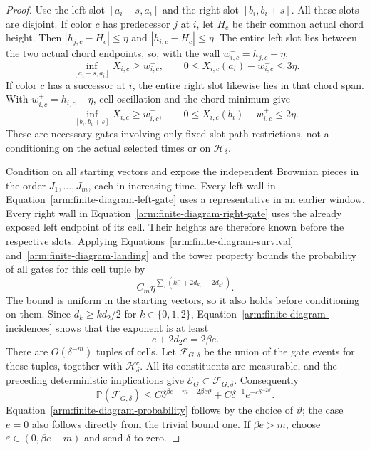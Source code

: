 \begin{proof}
Use the left slot $[a_i-s,a_i]$ and the right slot $[b_i,b_i+s]$.
All these slots are disjoint.  If color $c$ has predecessor $j$ at
$i$, let $H_c$ be their common actual chord height.  Then
$|h_{j,c}-H_c|\le\eta$ and $|h_{i,c}-H_c|\le\eta$.
The entire left slot lies between the two actual chord endpoints,
so, with the wall $w_{i,c}^-=h_{j,c}-\eta$,
\begin{equation}
\label{arm:finite-diagram-left-gate}
 \inf_{[a_i-s,a_i]}X_{i,c}\ge w_{i,c}^-,\qquad
 0\le X_{i,c}(a_i)-w_{i,c}^-\le3\eta.
\end{equation}
If color $c$ has a successor at $i$, the entire right slot likewise
lies in that chord span.  With $w_{i,c}^+=h_{i,c}-\eta$, cell
oscillation and the chord minimum give
\begin{equation}
\label{arm:finite-diagram-right-gate}
 \inf_{[b_i,b_i+s]}X_{i,c}\ge w_{i,c}^+,\qquad
 0\le X_{i,c}(b_i)-w_{i,c}^+\le2\eta.
\end{equation}
These are necessary gates involving only fixed-slot path restrictions,
not a conditioning on the actual selected times or on
$\mathcal H_\delta$.

Condition on all starting vectors and expose the independent Brownian
pieces in the order $J_1,\ldots,J_m$, each in increasing time.
Every left wall in Equation~\eqref{arm:finite-diagram-left-gate}
uses a representative in an earlier window.  Every right wall in
Equation~\eqref{arm:finite-diagram-right-gate} uses the already
exposed left endpoint of its cell.  Their heights are therefore
known before the respective slots.  Applying
Equations~\eqref{arm:finite-diagram-survival}
and~\eqref{arm:finite-diagram-landing} and the tower property bounds
the probability of all gates for this cell tuple by
\[
 C_m\eta^{\sum_i(k_i^-+2d_{k_i^-}+2d_{k_i^+})}.
\]
The bound is uniform in the starting vectors, so it also holds before
conditioning on them.  Since
$d_k\ge k d_2/2$ for $k\in\{0,1,2\}$,
Equation~\eqref{arm:finite-diagram-incidences} shows that the exponent
is at least
\[
 e+2d_2e=2\beta e.
\]
There are $O(\delta^{-m})$ tuples of cells.  Let
$\mathcal F_{G,\delta}$ be the union of the gate events for these
tuples, together with $\mathcal H_\delta^c$.  All its constituents
are measurable, and the preceding deterministic implications give
$\mathcal E_G\subset\mathcal F_{G,\delta}$.  Consequently
\[
 \mathbb P(\mathcal F_{G,\delta})
 \le C\delta^{\beta e-m-2\beta e\vartheta}
       +C\delta^{-1}e^{-c\delta^{-2\vartheta}}.
\]
Equation~\eqref{arm:finite-diagram-probability} follows by the choice
of $\vartheta$; the case $e=0$ also follows directly from the trivial bound
one.  If $\beta e>m$, choose $\varepsilon\in(0,\beta e-m)$ and
send $\delta$ to zero.


\end{proof}
